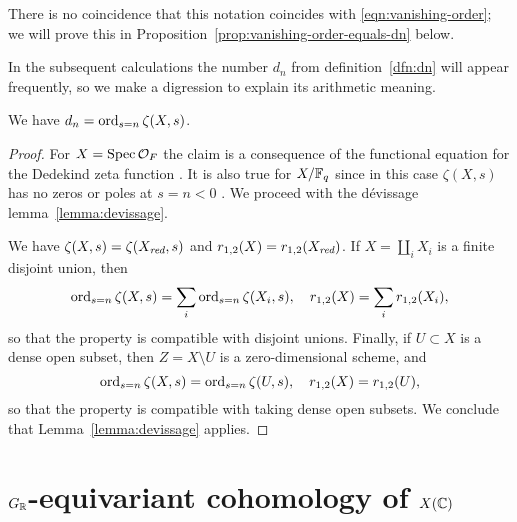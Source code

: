 \documentclass[draft]{article}
\numberwithin{equation}{section}
\begin{document}
There is no coincidence that this notation coincides with
\eqref{eqn:vanishing-order}; we will prove this
in Proposition~\ref{prop:vanishing-order-equals-dn} below.

In the subsequent calculations the number $d_n$ from definition~\ref{dfn:dn}
will appear frequently, so we make a digression to explain its arithmetic
meaning.

\begin{proposition}
  \label{prop:vanishing-order-equals-dn}
  We have $d_n = \operatorname{ord}_{s = n} \zeta (X,s)$.

  \begin{proof}
    For $X = \operatorname{Spec} \mathcal{O}_F$ the claim is a consequence of the functional
    equation for the Dedekind zeta function \cite[\S VII.5]{Neukirch-1999}.
    It is also true for $X/\mathbb{F}_q$ since in this case $\zeta (X,s)$ has no zeros
    or poles at $s = n < 0$ \cite[pp.\,26--27]{Katz-1994}. We proceed with
    the d\'{e}vissage lemma~\ref{lemma:devissage}.

    We have $\zeta (X,s) = \zeta (X_{\text{\it red}},s)$ and
    $r_{1,2} (X) = r_{1,2} (X_{\text{\it red}})$.
    If $X = \coprod_i X_i$ is a finite disjoint union, then
    \[ \operatorname{ord}_{s = n} \zeta (X,s) = \sum_i \operatorname{ord}_{s = n} \zeta (X_i,s),
      \quad
      r_{1,2} (X) = \sum_i r_{1,2} (X_i), \]
    so that the property is compatible with disjoint unions. Finally, if
    $U \subset X$ is a dense open subset, then $Z = X\setminus U$ is
    a zero-dimensional scheme, and
    \[ \operatorname{ord}_{s = n} \zeta (X,s) = \operatorname{ord}_{s = n} \zeta (U,s),
      \quad
      r_{1,2} (X) = r_{1,2} (U), \]
    so that the property is compatible with taking dense open subsets.
    We conclude that Lemma~\ref{lemma:devissage} applies.
  \end{proof}
\end{proposition}


\section{$G_{\mathbb{R}}$-equivariant cohomology of $X(\mathbb{C})$}
\end{document}
